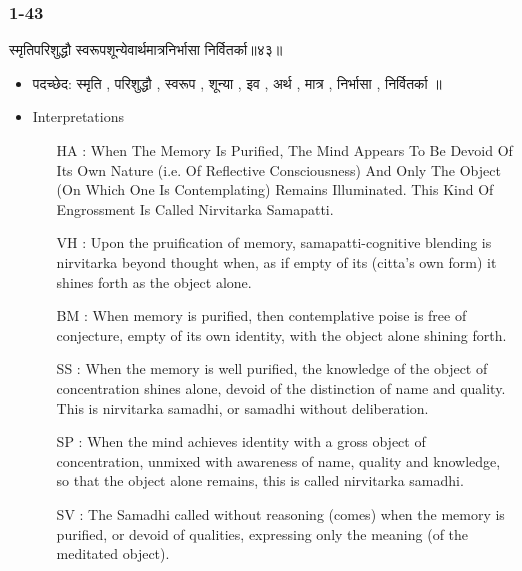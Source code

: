 \begin{frame}[fragile]\frametitle{1-43}
\begin{sanskrit}
स्मृतिपरिशुद्धौ स्वरूपशून्येवार्थमात्रनिर्भासा निर्वितर्का॥४३॥
\end{sanskrit}

	\begin{itemize}
	\item पदच्छेद: स्मृति , परिशुद्धौ , स्वरूप , शून्या , इव , अर्थ , मात्र , निर्भासा , निर्वितर्का ॥
	\item Interpretations
		\begin{itemize}
		\item [HA]: When The Memory Is Purified, The Mind Appears To Be Devoid Of Its Own Nature (i.e. Of Reflective Consciousness) And Only The Object (On Which One Is Contemplating) Remains Illuminated. This Kind Of Engrossment Is Called Nirvitarka Samapatti.
		\item [VH]: Upon the pruification of memory, samapatti-cognitive blending is nirvitarka beyond thought when, as if empty of its (citta’s own form) it shines forth as the object alone.
		\item [BM]: When memory is purified, then contemplative poise is free of conjecture, empty of its own identity, with the object alone shining forth.
		\item [SS]: When the memory is well purified, the knowledge of the object of concentration shines alone, devoid of the distinction of name and quality. This is nirvitarka samadhi, or samadhi without deliberation.
		\item [SP]: When the mind achieves identity with a gross object of concentration, unmixed with awareness of name, quality and knowledge, so that the object alone remains, this is called nirvitarka samadhi.
		\item [SV]: The Samadhi called without reasoning (comes) when the memory is purified, or devoid of qualities, expressing only the meaning (of the meditated object). 
		\end{itemize}
	\end{itemize}
	
\end{frame}



